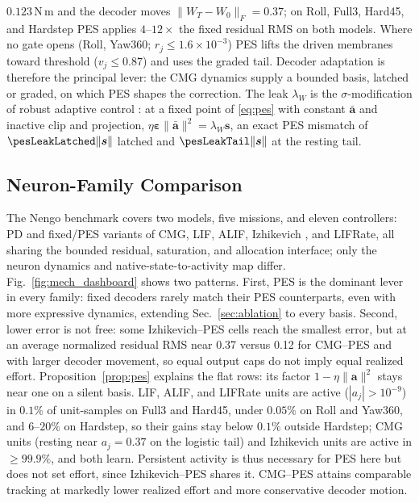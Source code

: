 \documentclass[letterpaper, 10 pt, conference]{ieeeconf}
\begin{document}
$0.123$\,N\,m and the decoder moves $\|W_T-W_0\|_F=0.37$; on Roll, Full3,
Hard45, and Hardstep PES applies $4$--$12\times$ the fixed residual RMS on
both models. Where no gate opens (Roll, Yaw360; $r_j\le1.6\times10^{-3}$)
PES lifts the driven membranes toward threshold ($v_j\le0.87$) and uses
the graded tail. Decoder adaptation is therefore the principal lever: the
CMG dynamics supply a bounded basis, latched or graded, on which PES
shapes the correction. The leak $\lambda_W$ is the $\sigma$-modification of
robust adaptive control \cite{ioannou1984sigma,ioannou1996robust}: at a fixed
point of \eqref{eq:pes} with constant $\bar{\bm a}$ and inactive clip and
projection, $\eta\bm\varepsilon\|\bar{\bm a}\|^2=\lambda_W\bm s$, an exact
PES mismatch of $\pesLeakLatched\|\bm s\|$ latched and $\pesLeakTail\|\bm s\|$
at the resting tail.

\subsection{Neuron-Family Comparison}
The Nengo benchmark covers two models, five missions, and eleven controllers: PD and fixed/PES variants of CMG, LIF, ALIF, Izhikevich \cite{izhikevich2003}, and LIFRate, all sharing the bounded residual, saturation, and allocation interface; only the neuron dynamics and native-state-to-activity map differ.
Fig.~\ref{fig:mech_dashboard} shows two patterns. First, PES is the
dominant lever in every family: fixed decoders rarely match their PES
counterparts, even with more expressive dynamics, extending
Sec.~\ref{sec:ablation} to every basis. Second, lower error is not free:
some Izhikevich--PES cells reach the smallest error, but at an average
normalized residual RMS near 0.37 versus 0.12 for CMG--PES and with larger
decoder movement, so equal output caps do not imply equal realized effort.
Proposition~\ref{prop:pes} explains the flat rows: its factor
$1-\eta\|\bm a\|^2$ stays near one on a silent basis. LIF, ALIF, and LIFRate
units are active ($|a_j|>10^{-9}$) in $0.1\%$ of unit-samples on Full3 and
Hard45, under $0.05\%$ on Roll and Yaw360, and $6$--$20\%$ on Hardstep, so
their gains stay below $0.1\%$ outside Hardstep; CMG units (resting near
$a_j=0.37$ on the logistic tail) and Izhikevich units are active in
${\ge}99.9\%$, and both learn. Persistent activity is thus
necessary for PES here but does not set effort, since Izhikevich--PES shares
it. CMG--PES attains comparable tracking at markedly lower realized effort
and more conservative decoder motion.
\end{document}
